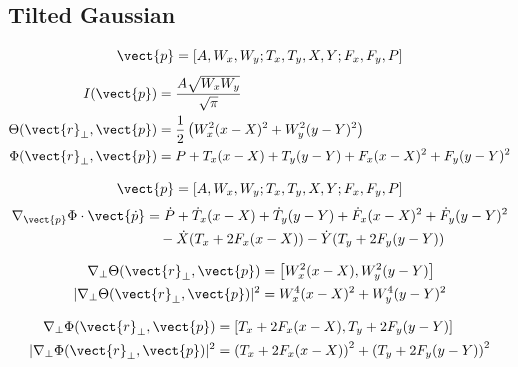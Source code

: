 \subsection{Tilted Gaussian}
\begin{equation}
    \vect{p} = \left[A, W_x,W_y; T_x, T_y, X, Y; F_x,F_y, P\right]
\end{equation}
\begin{equation}
    \begin{split}
        I(\vect{p}) &= \frac{A \sqrt{W_x W_y}}{\sqrt{\pi}} \\
        \Theta(\vect{r}_{\perp},\vect{p}) &= \frac{1}{2} \left( W_x^2(x-X)^2 + W_y^2(y-Y)^2 \right) \\
        \Phi(\vect{r}_{\perp},\vect{p}) &= P + T_x (x-X) + T_y (y-Y) + F_x (x-X)^2 + F_{y} (y-Y)^2
    \end{split}
\end{equation}




\begin{equation}
    \vect{p} = \left[A, W_x,W_y; T_x, T_y, X, Y; F_x,F_y, P\right]
\end{equation}
\begin{equation}
    \begin{split}
        \nabla_{\vect{p}}{\Phi}\cdot\vect{\dot{p}} &= \dot{P} + \dot{T}_x (x-X) + \dot{T}_y (y-Y) + \dot{F}_{x} (x-X)^2 + \dot{F}_{y} (y-Y)^2 \\
        &\quad - \dot{X} (T_x + 2F_x(x-X)) - \dot{Y} (T_y + 2F_y(y-Y)) \\
    \end{split}
\end{equation}

\begin{equation}
    \begin{split}
        \nabla_{\perp}\Theta(\vect{r}_{\perp},\vect{p}) &= \left[ W_x^2 (x-X),  W_y^2 (y-Y) \right] \\
        |\nabla_{\perp}\Theta(\vect{r}_{\perp},\vect{p})|^2 &= W_x^4 (x-X)^2 +  W_y^4 (y-Y)^2 \\
    \end{split}
\end{equation}

\begin{equation}
    \begin{split}
        \nabla_{\perp}\Phi(\vect{r}_{\perp},\vect{p}) &= \left[T_x + 2 F_x (x-X), T_y + 2 F_{y} (y-Y)\right] \\
        |\nabla_{\perp}\Phi(\vect{r}_{\perp},\vect{p})|^2 &= \left(T_x + 2 F_x (x-X)\right)^2 +  \left(T_y + 2 F_{y} (y-Y)\right)^2
    \end{split}
\end{equation}

